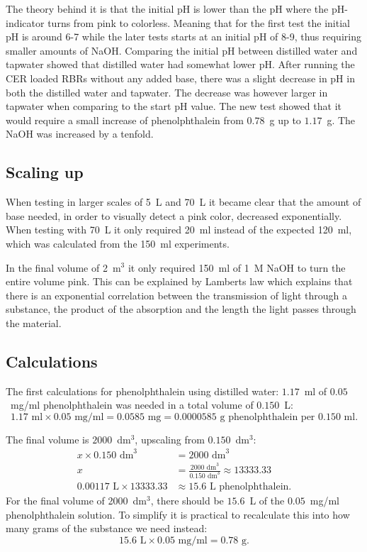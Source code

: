 The theory behind it is that the initial pH is lower than the pH where the pH-indicator turns from pink to colorless. Meaning that for the first test the initial pH is around 6-7 while the later tests starts at an initial pH of 8-9, thus requiring smaller amounts of NaOH.
Comparing the initial pH between distilled water and tapwater showed that distilled water had somewhat lower pH. After running the CER loaded RBRs without any added base, there was a slight decrease in pH in both the distilled water and tapwater. The decrease was however larger in tapwater when comparing to the start pH value.
The new test showed that it would require a small increase of phenolphthalein from $0.78$~g up to $1.17$~g. The NaOH was increased by a tenfold.

\subsection{Scaling up}
When testing in larger scales of 5~L and 70~L it became clear that the amount of base needed, in order to visually detect a pink color, decreased exponentially. When testing with 70~L it only required 20~ml instead of the expected 120~ml, which was calculated from the 150~ml experiments.

In the final volume of 2~m$^3$ it only required 150~ml of 1~M NaOH to turn the entire volume pink. This can be explained by Lamberts law which explains that there is an exponential correlation between the transmission of light through a substance, the product of the absorption and the length the light passes through the material.\cite{pierre}

\subsection{Calculations}\label{sec:calculations}
The first calculations for phenolphthalein using distilled water:
$1.17$~ml of $0.05$~mg/ml phenolphthalein was needed in a total volume of $0.150$~L:
\begin{equation}\label{eq:concentration}
    1.17 \text{ ml} \times 0.05 \text{ mg/ml}
    = 0.0585 \text{ mg} = 0.0000585 \text{ g} \text{ phenolphthalein per } 0.150 \text{ ml}.
\end{equation}

The final volume is $2000$~dm$^3$, upscaling from $0.150$~dm$^3$:
\begin{align}
x \times 0.150 \text{ dm}^3 &= 2000 \text{ dm}^3 \nonumber \\
x &= \frac{2000 \text{ dm}^3}{0.150 \text{ dm}^3} \approx 13333.33 \\
0.00117 \text{ L} \times 13333.33 &\approx 15.6 \text{ L phenolphthalein.} 
\end{align}
For the final volume of 2000~dm$^3$, there should be $15.6$~L of the $0.05$~mg/ml phenolphthalein solution.
To simplify it is practical to recalculate this into how many grams of the substance we need instead:
\begin{equation}
    15.6 \text{ L} \times 0.05 \text{ mg/ml} = 0.78 \text{ g}.
\end{equation}

